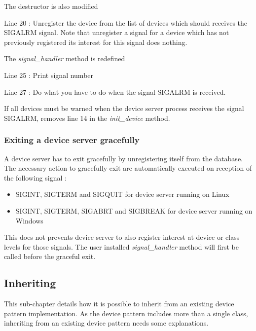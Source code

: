 The destructor is also modified

Line 20 : Unregister the device from the list of devices which should
receives the SIGALRM signal. Note that unregister a signal for a device
which has not previously registered its interest for this signal does
nothing.

The \emph{signal\_handler} method is redefined

Line 25 : Print signal number

Line 27 : Do what you have to do when the signal SIGALRM is received.

If all devices must be warned when the device server process receives
the signal SIGALRM, removes line 14 in the \emph{init\_device} method.


\subsubsection{Exiting a device server gracefully}

A device server has to exit gracefully
by unregistering itself from the database. The necessary action to
gracefully exit are automatically executed on reception of the following
signal :
\begin{itemize}
\item SIGINT, SIGTERM and SIGQUIT for device server running on Linux
\item SIGINT, SIGTERM, SIGABRT and SIGBREAK for device server running on
Windows
\end{itemize}
This does not prevents device server to also register interest at
device or class levels for those signals. The user installed \emph{signal\_handler}
method will first be called before the graceful exit.


\subsection{Inheriting}
\label{Inheriting}

This sub-chapter details how it is possible to inherit
from an existing device pattern implementation. As the device pattern
includes more than a single class, inheriting from an existing device
pattern needs some explanations.


